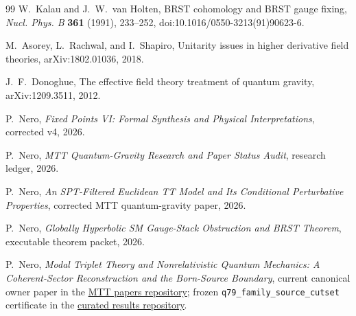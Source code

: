 \documentclass[11pt]{article}
\begin{document}
\begin{thebibliography}{99}
W.~Kalau and J.~W.~van Holten,
BRST cohomology and BRST gauge fixing,
\emph{Nucl. Phys. B} \textbf{361} (1991), 233--252,
doi:10.1016/0550-3213(91)90623-6.

M.~Asorey, L.~Rachwal, and I.~Shapiro,
Unitarity issues in higher derivative field theories,
arXiv:1802.01036, 2018.

J.~F.~Donoghue,
The effective field theory treatment of quantum gravity,
arXiv:1209.3511, 2012.

P.~Nero,
\emph{Fixed Points VI: Formal Synthesis and Physical Interpretations},
corrected v4, 2026.

P.~Nero,
\emph{MTT Quantum-Gravity Research and Paper Status Audit},
research ledger, 2026.

P.~Nero,
\emph{An SPT-Filtered Euclidean TT Model and Its Conditional Perturbative
Properties},
corrected MTT quantum-gravity paper, 2026.

P.~Nero,
\emph{Globally Hyperbolic SM Gauge-Stack Obstruction and BRST Theorem},
executable theorem packet, 2026.

P.~Nero, \emph{Modal Triplet Theory and Nonrelativistic Quantum Mechanics:
A Coherent-Sector Reconstruction and the Born-Source Boundary},
current canonical owner paper in the
\href{https://github.com/PeterNero/mtt-papers/tree/main/papers/modal-triplet-theory-from-mtt-to-quantum-mechanics}{MTT papers repository};
frozen \nolinkurl{q79_family_source_cutset} certificate in the
\href{https://github.com/PeterNero/mtt-results-repro/tree/f141a20ea23c5c3ff19cc2161c0e226e29ade8a7/release/results/q79_family_source_cutset}{curated results repository}.

\end{thebibliography}
\normalsize
\end{document}
